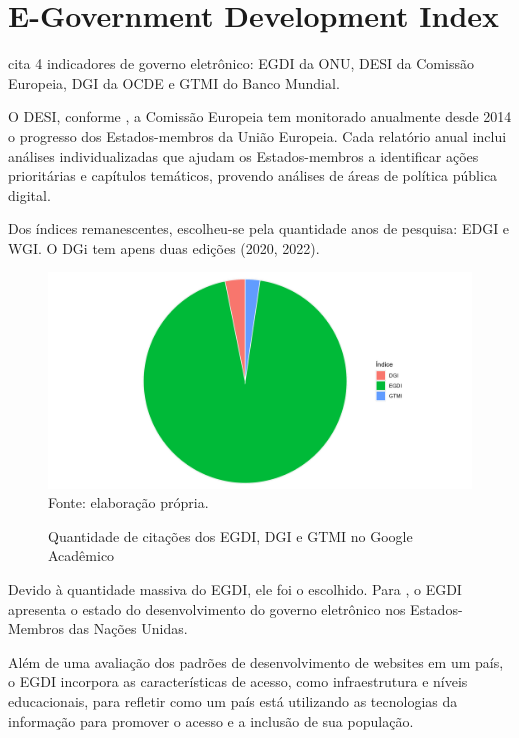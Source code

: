 \chapter{E-Government Development Index}

\cite{martinez2022egovernment} cita 4 indicadores de governo eletrônico: EGDI da ONU, DESI da Comissão Europeia, DGI da OCDE e GTMI do Banco Mundial.

O DESI, conforme \cite{desi_2022}, a Comissão Europeia tem monitorado anualmente desde 2014 o progresso dos Estados-membros da União Europeia. Cada relatório anual inclui análises individualizadas que ajudam os Estados-membros a identificar ações prioritárias e capítulos temáticos, provendo análises de áreas de política pública digital.

Dos índices remanescentes, escolheu-se pela quantidade anos de pesquisa: EDGI e WGI. O DGi tem apens duas edições (2020, 2022).

\begin{figure}[H]
    \centering
    \caption{Quantidade de citações dos EGDI, DGI e GTMI no Google Acadêmico}
    \includegraphics[width=1\linewidth]{figuras/egov_indices.png}
    \label{fig:egov_indices}
    \footnotesize{Fonte: elaboração própria.}
\end{figure}

Devido à quantidade massiva do EGDI, ele foi o escolhido. Para \cite{ONU_EGDI_description}, o EGDI apresenta o estado do desenvolvimento do governo eletrônico nos Estados-Membros das Nações Unidas.

Além de uma avaliação dos padrões de desenvolvimento de websites em um país, o EGDI incorpora as características de acesso, como infraestrutura e níveis educacionais, para refletir como um país está utilizando as tecnologias da informação para promover o acesso e a inclusão de sua população. 

